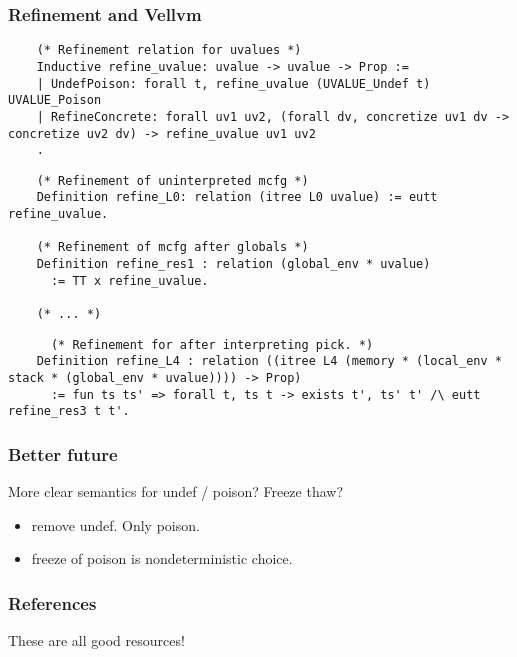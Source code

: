 \documentclass{beamer}
\begin{document}
\begin{frame}[fragile]
  \frametitle{Refinement and Vellvm}

\begin{lstlisting}
    (* Refinement relation for uvalues *)
    Inductive refine_uvalue: uvalue -> uvalue -> Prop :=
    | UndefPoison: forall t, refine_uvalue (UVALUE_Undef t) UVALUE_Poison
    | RefineConcrete: forall uv1 uv2, (forall dv, concretize uv1 dv -> concretize uv2 dv) -> refine_uvalue uv1 uv2
    .
\end{lstlisting}

  \pause
  
\begin{lstlisting}
    (* Refinement of uninterpreted mcfg *)
    Definition refine_L0: relation (itree L0 uvalue) := eutt refine_uvalue.

    (* Refinement of mcfg after globals *)
    Definition refine_res1 : relation (global_env * uvalue)
      := TT x refine_uvalue.

    (* ... *)
\end{lstlisting}

  \pause

\begin{lstlisting}
      (* Refinement for after interpreting pick. *)
    Definition refine_L4 : relation ((itree L4 (memory * (local_env * stack * (global_env * uvalue)))) -> Prop)
      := fun ts ts' => forall t, ts t -> exists t', ts' t' /\ eutt refine_res3 t t'.
\end{lstlisting}

\end{frame}

\begin{frame}
  \frametitle{Better future}

  More clear semantics for undef / poison? Freeze thaw?

  \begin{itemize}
  \item remove undef. Only poison.
  \item freeze of poison is nondeterministic choice.
  \end{itemize}
\end{frame}

  \begin{frame}[allowframebreaks]
    \frametitle{References}

  \nocite{*}
  \printbibliography

  These are all good resources!
\end{frame}
\end{document}
